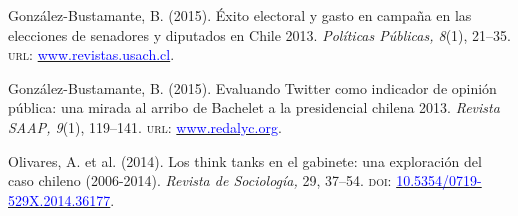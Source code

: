 \begin{publications}
\begin{benumerate}{14}
\item{\small González-Bustamante, B. (2015). Éxito electoral y gasto en campaña en las elecciones de senadores y diputados en Chile 2013. {\itshape Políticas Públicas, 8}(1), 21--35. {\scshape url:} \href{http://www.revistas.usach.cl/ojs/index.php/politicas/article/view/2182}{\textcolor{blue}{www.revistas.usach.cl}}.} \vspace{1mm}


\item{\small González-Bustamante, B. (2015). Evaluando Twitter como indicador de opinión pública: una mirada al arribo de Bachelet a la presidencial chilena 2013. {\itshape Revista SAAP, 9}(1), 119--141. {\scshape url:} \href{https://www.redalyc.org/articulo.oa?id=387142733006}{\textcolor{blue}{www.redalyc.org}}.} \vspace{1mm}


\item{\small Olivares, A. et al. (2014). Los think tanks en el gabinete: una exploración del caso chileno (2006-2014). {\itshape Revista de Sociología,} 29, 37--54. {\scshape doi}: \href{https://doi.org/10.5354/0719-529X.2014.36177}{\textcolor{blue}{10.5354/0719-529X.2014.36177}}.} \vspace{1mm} %


\end{benumerate}
\end{publications}
